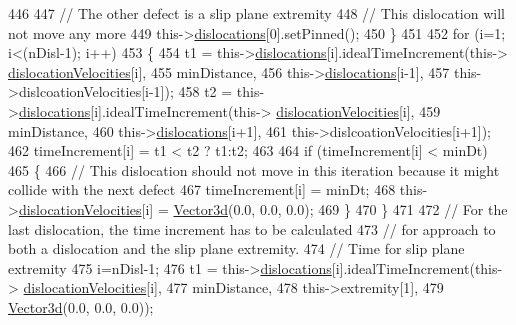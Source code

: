 \begin{DoxyCode}
446 
447        \textcolor{comment}{// The other defect is a slip plane extremity}
448        \textcolor{comment}{// This dislocation will not move any more}
449        this->\hyperlink{classSlipPlane_ad92c7c409f7e161db449528389180910}{dislocations}[0].setPinned();
450      \}
451 
452    \textcolor{keywordflow}{for} (i=1; i<(nDisl-1); i++)
453      \{
454        t1 = this->\hyperlink{classSlipPlane_ad92c7c409f7e161db449528389180910}{dislocations}[i].idealTimeIncrement(this->
      \hyperlink{classSlipPlane_a107a3883169bf918664cb4e4fd4bd72c}{dislocationVelocities}[i],
455                                                      minDistance,
456                                                      this->\hyperlink{classSlipPlane_ad92c7c409f7e161db449528389180910}{dislocations}[i-1],
457                                                      this->dislcoationVelocities[i-1]);
458        t2 = this->\hyperlink{classSlipPlane_ad92c7c409f7e161db449528389180910}{dislocations}[i].idealTimeIncrement(this->
      \hyperlink{classSlipPlane_a107a3883169bf918664cb4e4fd4bd72c}{dislocationVelocities}[i],
459                                                      minDistance,
460                                                      this->\hyperlink{classSlipPlane_ad92c7c409f7e161db449528389180910}{dislocations}[i+1],
461                                                      this->dislcoationVelocities[i+1]);
462        timeIncrement[i] = t1 < t2 ? t1:t2;
463 
464        \textcolor{keywordflow}{if} (timeIncrement[i] < minDt)
465          \{
466            \textcolor{comment}{// This dislocation should not move in this iteration because it might collide with the next
       defect}
467            timeIncrement[i] = minDt;
468            this->\hyperlink{classSlipPlane_a107a3883169bf918664cb4e4fd4bd72c}{dislocationVelocities}[i] = \hyperlink{classVector3d}{Vector3d}(0.0, 0.0, 0.0);
469          \}
470      \}
471 
472    \textcolor{comment}{// For the last dislocation, the time increment has to be calculated}
473    \textcolor{comment}{// for approach to both a dislocation and the slip plane extremity.}
474    \textcolor{comment}{// Time for slip plane extremity}
475    i=nDisl-1;
476    t1 = this->\hyperlink{classSlipPlane_ad92c7c409f7e161db449528389180910}{dislocations}[i].idealTimeIncrement(this->
      \hyperlink{classSlipPlane_a107a3883169bf918664cb4e4fd4bd72c}{dislocationVelocities}[i],
477                                                  minDistance,
478                                                  this->extremity[1],
479                                                  \hyperlink{classVector3d}{Vector3d}(0.0, 0.0, 0.0));

\end{DoxyCode}
